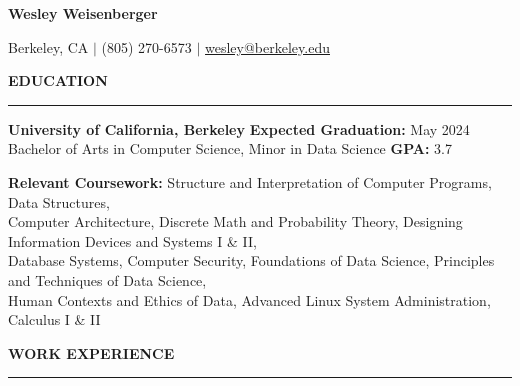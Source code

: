 \documentclass{article}
\begin{document}
    \newcommand{\header}[1]{ 
        \vspace{4mm}
        {\large \noindent \textbf{#1}}
        \vspace{1.5mm}
        \hrule
        \vspace{2mm}
    }

    \begin{center}
        
        {\LARGE \textbf{Wesley Weisenberger}}
    
        \vspace{2mm}

        {\large Berkeley, CA  $\mid$ (805) 270-6573 
            $\mid$
            \href{mailto:wesley@berkeley.edu}{wesley@berkeley.edu}

        }

    \end{center}

    
    \header{EDUCATION}

        \begin{adjustwidth}{1em}{1em}

            \textbf{University of California, Berkeley} 
            \hfill 
            \textbf{Expected Graduation:} May 2024 \\
            Bachelor of Arts in Computer Science, Minor in Data Science \hfill  \textbf{GPA:} 3.7

            \vspace{2.5mm}

            \textbf{Relevant Coursework:}
                Structure and Interpretation of Computer Programs, 
                Data Structures, \\
                Computer Architecture,
                Discrete Math and Probability Theory, 
                Designing Information Devices and Systems I \& II, \\
                Database Systems, 
                Computer Security,
                Foundations of Data Science,
                Principles and Techniques of Data Science, \\
                Human Contexts and Ethics of Data, 
                Advanced Linux System Administration,
                Calculus I \& II

        \end{adjustwidth}

            
    \header{WORK EXPERIENCE}
\end{document}
